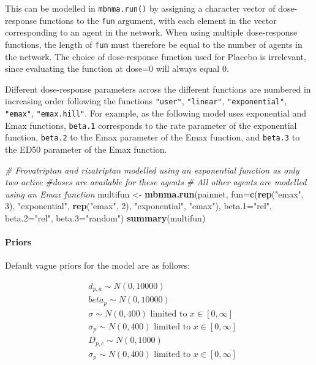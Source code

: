 \documentclass[]{article}
\newenvironment{Shaded}{\begin{snugshade}}{\end{snugshade}}
\newcommand{\CommentTok}[1]{\textcolor[rgb]{0.56,0.35,0.01}{\textit{#1}}}
\newcommand{\DataTypeTok}[1]{\textcolor[rgb]{0.13,0.29,0.53}{#1}}
\newcommand{\DecValTok}[1]{\textcolor[rgb]{0.00,0.00,0.81}{#1}}
\newcommand{\KeywordTok}[1]{\textcolor[rgb]{0.13,0.29,0.53}{\textbf{#1}}}
\newcommand{\NormalTok}[1]{#1}
\newcommand{\StringTok}[1]{\textcolor[rgb]{0.31,0.60,0.02}{#1}}
\let\oldparagraph\paragraph
\renewcommand{\paragraph}[1]{\oldparagraph{#1}\mbox{}}
\begin{document}
This can be modelled in \texttt{mbnma.run()} by assigning a character
vector of dose-response functions to the \texttt{fun} argument, with
each element in the vector corresponding to an agent in the network.
When using multiple dose-response functions, the length of \texttt{fun}
must therefore be equal to the number of agents in the network. The
choice of dose-response function used for Placebo is irrelevant, since
evaluating the function at dose=0 will always equal 0.

Different dose-response parameters across the different functions are
numbered in increasing order following the functions \texttt{"user"},
\texttt{"linear"}, \texttt{"exponential"}, \texttt{"emax"},
\texttt{"emax.hill"}. For example, as the following model uses
exponential and Emax functions, \texttt{beta.1} corresponds to the rate
parameter of the exponential function, \texttt{beta.2} to the Emax
parameter of the Emax function, and \texttt{beta.3} to the ED50
parameter of the Emax function.

\begin{Shaded}
\begin{Highlighting}[]
\CommentTok{# Frovatriptan and rizatriptan modelled using an exponential function as only two active}
\CommentTok{#doses are available for these agents}
\CommentTok{# All other agents are modelled using an Emax function}
\NormalTok{multifun <-}\StringTok{ }\KeywordTok{mbnma.run}\NormalTok{(painnet, }\DataTypeTok{fun=}\KeywordTok{c}\NormalTok{(}\KeywordTok{rep}\NormalTok{(}\StringTok{"emax"}\NormalTok{, }\DecValTok{3}\NormalTok{), }\StringTok{"exponential"}\NormalTok{, }\KeywordTok{rep}\NormalTok{(}\StringTok{"emax"}\NormalTok{, }\DecValTok{2}\NormalTok{), }\StringTok{"exponential"}\NormalTok{, }\StringTok{"emax"}\NormalTok{),}
            \DataTypeTok{beta.1=}\StringTok{"rel"}\NormalTok{, }\DataTypeTok{beta.2=}\StringTok{"rel"}\NormalTok{, }\DataTypeTok{beta.3=}\StringTok{"random"}\NormalTok{)}
\KeywordTok{summary}\NormalTok{(multifun)}
\end{Highlighting}
\end{Shaded}

\hypertarget{priors}{%
\paragraph{Priors}\label{priors}}

Default vague priors for the model are as follows:

\[
\begin{aligned}
  &d_{p,a} \sim N(0,10000)\\
  &beta_{p} \sim N(0,10000)\\
  &\sigma \sim N(0,400) \text{  limited to  } x \in [0,\infty]\\
  &\sigma_{p} \sim N(0,400) \text{  limited to  } x \in [0,\infty]\\
  &D_{p,c} \sim N(0,1000)\\
  &\sigma_{p} \sim N(0,400) \text{ limited to } x \in [0,\infty]\\
\end{aligned}
\]
\end{document}
